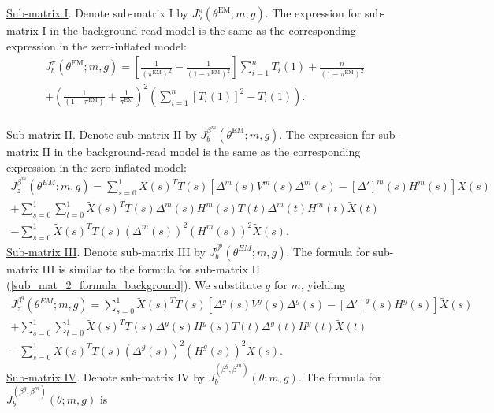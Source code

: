 \documentclass[12pt]{article}
\begin{document}
 \noindent \\ \\
 \underline{Sub-matrix I}. Denote sub-matrix I by $J_b^{\pi}(\theta^{\textrm{EM}}; m, g).$ The expression for sub-matrix I in the background-read model is the same as the corresponding expression in the zero-inflated model:
\begin{multline}\label{sub_mat_1_formula_background}
J_b^\pi(\theta^{\textrm{EM}}; m, g) = 
\left[ \frac{1}{(\pi^{\textrm{EM}})^2} - \frac{1}{ (1 - \pi^{\textrm{EM}} )^2} \right] \sum_{i=1}^n T_i(1) + \frac{n}{(1-\pi^{\textrm{EM}} )^2} \\ + \left( \frac{1}{(1 - \pi^{\textrm{EM}} )} + \frac{1}{\pi^{\textrm{EM}}} \right)^2 \left( \sum_{i=1}^n [T_i(1)]^2 - T_i(1) \right).
\end{multline}
\noindent \\
\underline{Sub-matrix II}. Denote sub-matrix II by $J^{\beta^m}_b(\theta^\textrm{EM}; m, g).$ The expression for sub-matrix II in the background-read model is the same as the corresponding expression in the zero-inflated model:
\begin{multline}\label{sub_mat_2_formula_background}
J_z^{\beta^m}(\theta^{EM}; m, g) = \sum_{s=0}^1 \tilde{X}(s)^T T(s) \left[ {\Delta}^m(s) {V}^m(s) {\Delta}^m(s) - [{\Delta}']^m(s) {H}^m(s) \right] \tilde{X}(s) \\ + \sum_{s=0}^1 \sum_{t=0}^1 \tilde{X}(s)^T {T}(s) {\Delta}^m(s) {H}^m(s) {T}(t) {\Delta}^m(t) {H}^m(t) \tilde{X}(t) \\ - \sum_{s=0}^1 \tilde{X}(s)^T {T}(s) ({\Delta}^m(s))^2 ({H}^m(s))^2 \tilde{X}(s).
\end{multline}
\underline{Sub-matrix III}. Denote sub-matrix III by $J_b^{\beta^g}(\theta^{EM}; m, g).$ The formula for sub-matrix III is similar to the formula for sub-matrix II (\ref{sub_mat_2_formula_background}). We substitute $g$ for $m$, yielding
\begin{multline}\label{sub_mat_3_formula_background}
J_z^{\beta^g}(\theta^{EM}; m, g) = \sum_{s=0}^1 \tilde{X}(s)^T T(s) \left[ {\Delta}^g(s) {V}^g(s) {\Delta}^g(s) - [{\Delta}']^g(s) {H}^g(s) \right] \tilde{X}(s) \\+ \sum_{s=0}^1 \sum_{t=0}^1 \tilde{X}(s)^T {T}(s) {\Delta}^g(s) {H}^g(s) {T}(t) {\Delta}^g(t) {H}^g(t) \tilde{X}(t) \\ - \sum_{s=0}^1 \tilde{X}(s)^T {T}(s) ({\Delta}^g(s))^2 ({H}^g(s))^2 \tilde{X}(s).
\end{multline}
\underline{Sub-matrix IV}. Denote sub-matrix IV by $J_b^{(\beta^g, \beta^m)}(\theta; m, g)$. The formula for $J_b^{(\beta^g, \beta^m)}(\theta; m, g)$ is 
\end{document}
